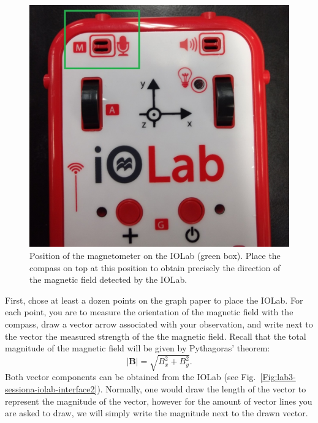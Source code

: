 \documentclass[12pt]{report}
\begin{document}
\begin{figure}[h]
\centering
\includegraphics[scale=0.3]{lab3-sessiona-iolab-sensor}
\caption{Position of the magnetometer on the IOLab (green box). Place the compass on top at this position to obtain precisely the direction of the magnetic field detected by the IOLab.}
\label{Fig:lab3-sessiona-iolab-sensor}
\end{figure}

First, chose at least a dozen points on the graph paper to place the IOLab. For each point, you are to measure the orientation of the magnetic field with the compass, draw a vector arrow associated with your observation, and write next to the vector the measured strength of the the magnetic field. Recall that the total magnitude of the magnetic field will be given by Pythagoras' theorem:
\begin{equation}
| \mathbf{B} | = \sqrt{B_x^2 +B_y^2}.
\end{equation}
Both vector components can be obtained from the IOLab (see Fig.~\ref{Fig:lab3-sessiona-iolab-interface2}). Normally, one would draw the length of the vector to represent the magnitude of the vector, however for the amount of vector lines you are asked to draw, we will simply write the magnitude next to the drawn vector.
\end{document}
